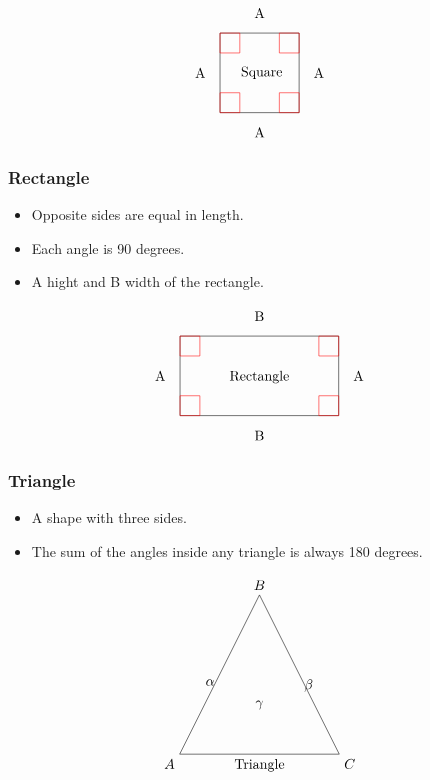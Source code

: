 \[
\begin{tikzpicture}
    \draw (0,0) rectangle (2,2);

    \node (A) at (-.5,1) {A};
    \draw[red] (0,0) rectangle (0.5,0.5);
    \node (A) at (2.5,1) {A};
    \draw[red] (1.5,0) rectangle (2,0.5);
    \node (B) at (1,-.5) {A};
    \draw[red] (0,1.5) rectangle (0.5,2);
    \node (C) at (1,2.5) {A};
    \draw[red] (1.5,1.5) rectangle (2,2);

    \node[left] at (1.7,1) {Square};
\end{tikzpicture}
\]

\subsubsection{Rectangle}
\begin{itemize}
    \item Opposite sides are equal in length.
    \item Each angle is 90 degrees.
    \item A hight and B width of the rectangle.
\end{itemize}

\[
\begin{tikzpicture}
    \draw (0,0) -- (4,0) -- (4,2) -- (0,2) -- cycle;
    \node[below] at (2,1.25) {Rectangle};
    \node (A) at (-.5,1) {A};
    \draw[red] (0,0) rectangle (0.5,0.5);
    \node (A) at (4.5,1) {A};
    \draw[red] (3.5,0) rectangle (4,0.5);
    \node (B) at (2,-.5) {B};
    \draw[red] (0,1.5) rectangle (0.5,2);
    \node (C) at (2,2.5) {B};   
    \draw[red] (3.5,1.5) rectangle (4,2);
\end{tikzpicture}
\]
\subsubsection{Triangle}
\begin{itemize}
    \item A shape with three sides.
    \item The sum of the angles inside any triangle is always 180 degrees.
\end{itemize}
\[
\begin{tikzpicture}
    \draw (0,0) -- (2,4) -- (4,0) -- cycle;
    \node[below] at (2,0) {Triangle};
    \node[below left] at (0,0) {$A$};
    \node[above] at (2,4) {$B$};
    \node[below right] at (4,0) {$C$};
    \node[below left] at (1,2) {$\alpha$};
    \node[below right] at (3,2) {$\beta$};
    \node[above] at (2,1) {$\gamma$};
\end{tikzpicture}
\]

